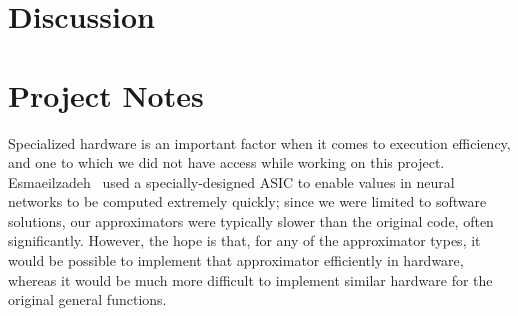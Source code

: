 \documentclass{article}
\begin{document}
\section{Discussion}

\section{Project Notes}

Specialized hardware is an important factor when it comes to execution efficiency, and one to which we did not have access while working on this project. Esmaeilzadeh~\cite{Esmaeilzadeh12} used a specially-designed ASIC to enable values in neural networks to be computed extremely quickly; since we were limited to software solutions, our approximators were typically slower than the original code, often significantly. However, the hope is that, for any of the approximator types, it would be possible to implement that approximator efficiently in hardware, whereas it would be much more difficult to implement similar hardware for the original general functions.



\end{document}
